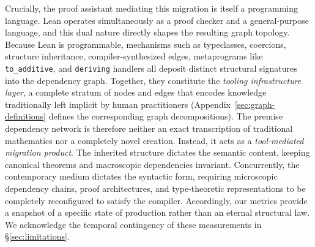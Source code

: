 Crucially, the proof assistant mediating this migration is itself a programming language. Lean operates simultaneously as a proof checker and a general-purpose language, and this dual nature directly shapes the resulting graph topology. Because Lean is programmable, mechanisms such as typeclasses, coercions, structure inheritance, compiler-synthesized edges, metaprograms like \texttt{to\_additive}, and \texttt{deriving} handlers all deposit distinct structural signatures into the dependency graph. Together, they constitute the \emph{tooling infrastructure layer}, a complete stratum of nodes and edges that encodes knowledge traditionally left implicit by human practitioners (Appendix~\ref{sec:graph-definitions} defines the corresponding graph decompositions). The premise dependency network is therefore neither an exact transcription of traditional mathematics nor a completely novel creation. Instead, it acts as a \emph{tool-mediated migration product}. The inherited structure dictates the semantic content, keeping canonical theorems and macroscopic dependencies invariant. Concurrently, the contemporary medium dictates the syntactic form, requiring microscopic dependency chains, proof architectures, and type-theoretic representations to be completely reconfigured to satisfy the compiler. Accordingly, our metrics provide a snapshot of a specific state of production rather than an eternal structural law. We acknowledge the temporal contingency of these measurements in \S\ref{sec:limitations}.

